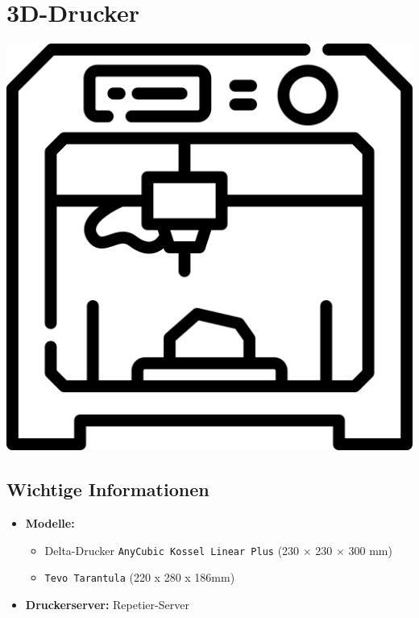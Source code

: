 \documentclass{article}
\begin{document}
	
	\noindent
	\begin{minipage}{0.25\textwidth}
		\section*{3D-Drucker}
	\end{minipage}
	\hfill
	\begin{minipage}{0.1\textwidth}
		\includegraphics[width=\textwidth]{3d-printing.png}
	\end{minipage}
	\hspace{2em}	
	\begin{minipage}{0.1\textwidth}
				
	\end{minipage}%
	
	\subsection*{Wichtige Informationen}
	\begin{itemize}
		\item \textbf{Modelle:}
		\begin{itemize}
			\item Delta-Drucker \texttt{AnyCubic Kossel Linear Plus} (230 × 230 × 300 mm)
			\item \texttt{Tevo Tarantula} (220 x 280 x 186mm)
		\end{itemize}
		\item \textbf{Druckerserver:} Repetier-Server
	\end{itemize}
	
\end{document}

